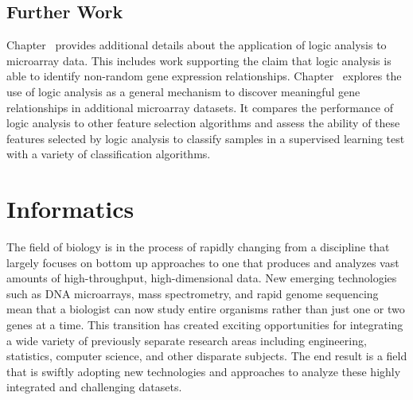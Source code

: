 \subsection{Further Work}

Chapter \logicanalysischapter\ provides additional details about the application
of logic analysis to microarray data.  This includes work supporting the claim
that logic analysis is able to identify non-random gene expression
relationships.  Chapter \featureselchapter\ explores the use of logic analysis
as a general mechanism to discover meaningful gene relationships in additional
microarray datasets.  It compares the performance of logic analysis to other
feature selection algorithms and assess the ability of these features selected by
logic analysis to classify samples in a supervised learning test with a variety
of classification algorithms.





\newpage

\section{Informatics}

The field of biology is in the process of rapidly changing from a discipline
that largely focuses on bottom up approaches to one that produces and analyzes
vast amounts of high-throughput, high-dimensional data. New emerging
technologies such as DNA microarrays, mass spectrometry, and rapid genome
sequencing mean that a biologist can now study entire organisms rather than just
one or two genes at a time.  This transition has created exciting opportunities
for integrating a wide variety of previously separate research areas including
engineering, statistics, computer science, and other disparate subjects.  The
end result is a field that is swiftly adopting new technologies and approaches
to analyze these highly integrated and challenging datasets. 

